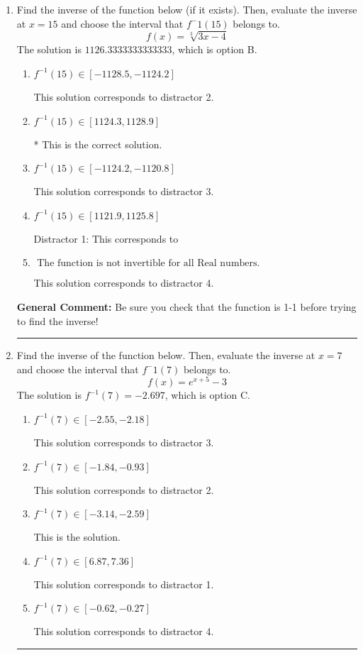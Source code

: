 \documentclass{extbook}[14pt]
\newcommand{\litem}[1]{\item #1

\rule{\textwidth}{0.4pt}}
\begin{document}
\begin{enumerate}\litem{
Find the inverse of the function below (if it exists). Then, evaluate the inverse at $x = 15$ and choose the interval that $f^-1(15)$ belongs to.
\[ f(x) = \sqrt[3]{3 x - 4} \]The solution is \( 1126.3333333333333 \), which is option B.\begin{enumerate}[label=\Alph*.]
\item \( f^{-1}(15) \in [-1128.5, -1124.2] \)

 This solution corresponds to distractor 2.
\item \( f^{-1}(15) \in [1124.3, 1128.9] \)

* This is the correct solution.
\item \( f^{-1}(15) \in [-1124.2, -1120.8] \)

 This solution corresponds to distractor 3.
\item \( f^{-1}(15) \in [1121.9, 1125.8] \)

 Distractor 1: This corresponds to 
\item \( \text{ The function is not invertible for all Real numbers. } \)

 This solution corresponds to distractor 4.
\end{enumerate}

\textbf{General Comment:} Be sure you check that the function is 1-1 before trying to find the inverse!
}
\litem{
Find the inverse of the function below. Then, evaluate the inverse at $x = 7$ and choose the interval that $f^-1(7)$ belongs to.
\[ f(x) = e^{x+5}-3 \]The solution is \( f^{-1}(7) = -2.697 \), which is option C.\begin{enumerate}[label=\Alph*.]
\item \( f^{-1}(7) \in [-2.55, -2.18] \)

 This solution corresponds to distractor 3.
\item \( f^{-1}(7) \in [-1.84, -0.93] \)

 This solution corresponds to distractor 2.
\item \( f^{-1}(7) \in [-3.14, -2.59] \)

 This is the solution.
\item \( f^{-1}(7) \in [6.87, 7.36] \)

 This solution corresponds to distractor 1.
\item \( f^{-1}(7) \in [-0.62, -0.27] \)

 This solution corresponds to distractor 4.
\end{enumerate}

}
\end{enumerate}
\end{document}

